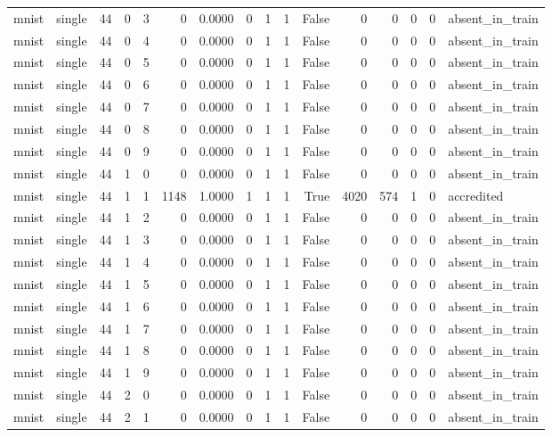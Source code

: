 \begin{tabular}{llrrrrrrrrrrrrrl}
mnist & single & 44 & 0 & 3 & 0 & 0.0000 & 0 & 1 & 1 & False & 0 & 0 & 0 & 0 & absent\_in\_train \\
mnist & single & 44 & 0 & 4 & 0 & 0.0000 & 0 & 1 & 1 & False & 0 & 0 & 0 & 0 & absent\_in\_train \\
mnist & single & 44 & 0 & 5 & 0 & 0.0000 & 0 & 1 & 1 & False & 0 & 0 & 0 & 0 & absent\_in\_train \\
mnist & single & 44 & 0 & 6 & 0 & 0.0000 & 0 & 1 & 1 & False & 0 & 0 & 0 & 0 & absent\_in\_train \\
mnist & single & 44 & 0 & 7 & 0 & 0.0000 & 0 & 1 & 1 & False & 0 & 0 & 0 & 0 & absent\_in\_train \\
mnist & single & 44 & 0 & 8 & 0 & 0.0000 & 0 & 1 & 1 & False & 0 & 0 & 0 & 0 & absent\_in\_train \\
mnist & single & 44 & 0 & 9 & 0 & 0.0000 & 0 & 1 & 1 & False & 0 & 0 & 0 & 0 & absent\_in\_train \\
mnist & single & 44 & 1 & 0 & 0 & 0.0000 & 0 & 1 & 1 & False & 0 & 0 & 0 & 0 & absent\_in\_train \\
mnist & single & 44 & 1 & 1 & 1148 & 1.0000 & 1 & 1 & 1 & True & 4020 & 574 & 1 & 0 & accredited \\
mnist & single & 44 & 1 & 2 & 0 & 0.0000 & 0 & 1 & 1 & False & 0 & 0 & 0 & 0 & absent\_in\_train \\
mnist & single & 44 & 1 & 3 & 0 & 0.0000 & 0 & 1 & 1 & False & 0 & 0 & 0 & 0 & absent\_in\_train \\
mnist & single & 44 & 1 & 4 & 0 & 0.0000 & 0 & 1 & 1 & False & 0 & 0 & 0 & 0 & absent\_in\_train \\
mnist & single & 44 & 1 & 5 & 0 & 0.0000 & 0 & 1 & 1 & False & 0 & 0 & 0 & 0 & absent\_in\_train \\
mnist & single & 44 & 1 & 6 & 0 & 0.0000 & 0 & 1 & 1 & False & 0 & 0 & 0 & 0 & absent\_in\_train \\
mnist & single & 44 & 1 & 7 & 0 & 0.0000 & 0 & 1 & 1 & False & 0 & 0 & 0 & 0 & absent\_in\_train \\
mnist & single & 44 & 1 & 8 & 0 & 0.0000 & 0 & 1 & 1 & False & 0 & 0 & 0 & 0 & absent\_in\_train \\
mnist & single & 44 & 1 & 9 & 0 & 0.0000 & 0 & 1 & 1 & False & 0 & 0 & 0 & 0 & absent\_in\_train \\
mnist & single & 44 & 2 & 0 & 0 & 0.0000 & 0 & 1 & 1 & False & 0 & 0 & 0 & 0 & absent\_in\_train \\
mnist & single & 44 & 2 & 1 & 0 & 0.0000 & 0 & 1 & 1 & False & 0 & 0 & 0 & 0 & absent\_in\_train \\

\end{tabular}
